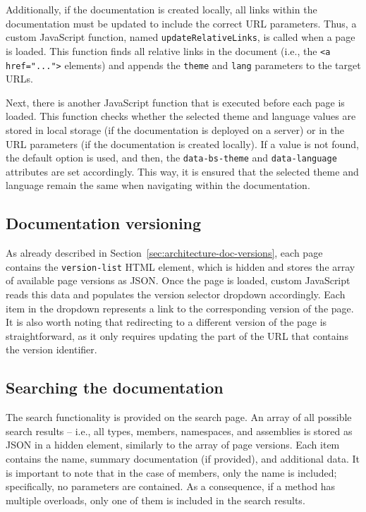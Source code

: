 Additionally, if the documentation is created locally, all links within the documentation must be updated to include the correct URL parameters.
Thus, a custom JavaScript function, named \texttt{updateRelativeLinks}, is called when a page is loaded.
This function finds all relative links in the document (i.e., the \linebreak \texttt{<a href="...">} elements) and appends the \texttt{theme} and \texttt{lang} parameters to the target URLs.

Next, there is another JavaScript function that is executed before each page is loaded.
This function checks whether the selected theme and language values are stored in local storage (if the documentation is deployed on a server) or in the URL parameters (if the documentation is created locally).
If a value is not found, the default option is used, and then, the \texttt{data-bs-theme} and \texttt{data-language} attributes are set accordingly.
This way, it is ensured that the selected theme and language remain the same when navigating within the documentation.

\subsection{Documentation versioning}
\label{sec:default-ui-version-dropdown}

As already described in Section~\ref{sec:architecture-doc-versions}, each page contains the \texttt{version-list} HTML element, which is hidden and stores the array of available page versions as JSON.
Once the page is loaded, custom JavaScript reads this data and populates the version selector dropdown accordingly.
Each item in the dropdown represents a link to the corresponding version of the page.
It is also worth noting that redirecting to a different version of the page is straightforward, as it only requires updating the part of the URL that contains the version identifier.

\subsection{Searching the documentation}
\label{sec:default-ui-search}

The search functionality is provided on the search page.
An array of all possible search results -- i.e., all types, members, namespaces, and assemblies is stored as JSON in a hidden element, similarly to the array of page versions.
Each item contains the name, summary documentation (if provided), and additional data.
It is important to note that in the case of members, only the name is included; specifically, no parameters are contained.
As a consequence, if a method has multiple overloads, only one of them is included in the search results.

